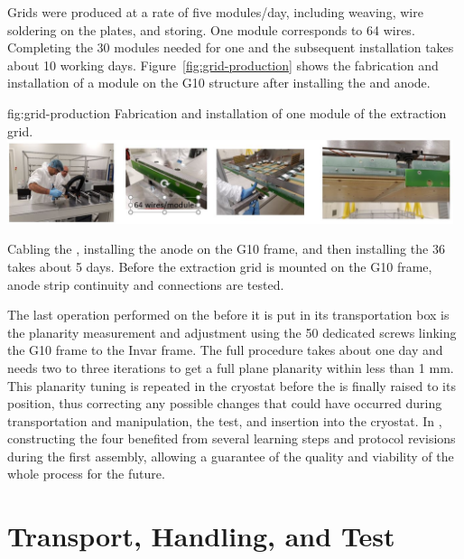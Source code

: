  Grids were produced at a rate of five modules/day, including weaving, wire soldering on the  plates, and storing. One module corresponds to \num{64} wires. Completing the \num{30} modules needed for one  and the subsequent
 installation takes about \num{10} working days. Figure~\ref{fig:grid-production} shows the fabrication and installation of
 a module on the G10 structure after installing the  and anode. 
\begin{dunefigure}
{fig:grid-production}
{Fabrication and installation of one module of the extraction grid.}
\includegraphics[width=0.98\textwidth]{graphics/grid-production}
\end{dunefigure}

Cabling the  , installing the anode on the G10 frame, and then installing the \num{36}  
takes about 5 days. Before the extraction grid is mounted on the G10 frame, anode strip continuity and  
 connections are tested.

The last operation performed on the  before it is put in its transportation box is the planarity  measurement and adjustment using the \num{50} dedicated screws linking the G10 frame to the Invar frame. The full procedure takes about one day and needs two to three iterations to get a full plane planarity within less than 1 mm. This planarity tuning is repeated in the cryostat before the  is finally raised to its position, thus correcting any possible changes that could have occurred during transportation and manipulation, the \coldbox test, and insertion into the cryostat.
In , constructing the four  benefited from several learning steps and protocol revisions during the first 
assembly, allowing a guarantee of the quality and viability of the whole process for the future.


\section{Transport, Handling, and \coldbox Test}
\label{sec:dp-crp-transport}

